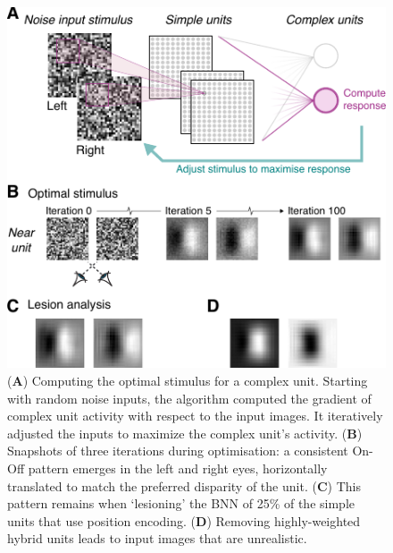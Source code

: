 {\begin{figure}[!h]
  \centering
  \includegraphics{chapter1/chapter1-figs/Fig4.pdf}
  \caption[Optimal stimuli for the binocular neural network.]{({\bf A}) Computing the optimal stimulus for a complex unit. Starting with random noise inputs, the algorithm computed the gradient of complex unit activity with respect to the input images. It iteratively adjusted the inputs to maximize the complex unit's activity. ({\bf B}) Snapshots of three iterations during optimisation: a consistent On-Off pattern emerges in the left and right eyes, horizontally translated to match the preferred disparity of the unit. ({\bf C}) This pattern remains when `lesioning' the BNN of 25\% of the simple units that use position encoding. ({\bf D}) Removing highly-weighted hybrid units leads to input images that are unrealistic.}
  \label{fig:c1f4}
\end{figure}


}
